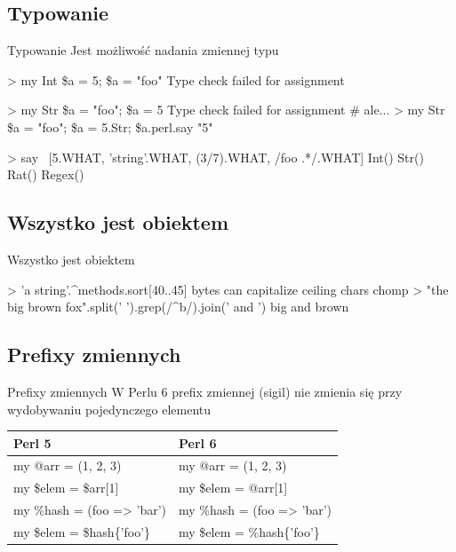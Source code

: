 \documentclass{beamer}
\begin{document}
			\subsection{Typowanie}
\begin{frame}[fragile]{Typowanie}
	Jest możliwość nadania zmiennej typu

	\begin{semiverbatim}
\alert{> my Int \$a = 5; \$a = "foo"}
Type check failed for assignment
	\end{semiverbatim}

	\begin{semiverbatim}
\alert{> my Str \$a = "foo"; \$a = 5}
Type check failed for assignment
# ale...
\alert{> my Str \$a = "foo"; \$a = 5.Str; \$a.perl.say}
"5"
	\end{semiverbatim}
	\begin{semiverbatim}
\alert{> say ~[5.WHAT, 'string'.WHAT, (3/7).WHAT, /foo .*/.WHAT]}
Int() Str() Rat() Regex()
	\end{semiverbatim}
\end{frame}

			\subsection{Wszystko jest obiektem}

\begin{frame}[fragile]{Wszystko jest obiektem}
	\begin{semiverbatim}
\alert{> 'a string'.\^\relax{}methods.sort[40..45]}
bytes can capitalize ceiling chars chomp
\alert{> "the big brown fox".split(' ').grep(/\^\relax{}b/).join(' and ')}
big and brown
	\end{semiverbatim}
\end{frame}
			\subsection{Prefixy zmiennych}
\begin{frame}{Prefixy zmiennych}
		W Perlu 6 prefix zmiennej (sigil) nie zmienia się przy wydobywaniu pojedynczego elementu
	\vskip15pt
	\begin{tabular}{l|l}
	Perl 5 & Perl 6 \\
	\hline
	\hline
	my @arr = (1, 2, 3) & my @arr = (1, 2, 3) \\
	my \$elem = \alert{\$arr}[1] & my \$elem = \alert{@arr}[1] \\
	\hline
	my \%hash = (foo => 'bar') & my \%hash = (foo => 'bar') \\
	my \$elem = \alert{\$hash}\{'foo'\} & my \$elem = \alert{\%hash}\{'foo'\} \\
	\end{tabular}
\end{frame}
\end{document}
